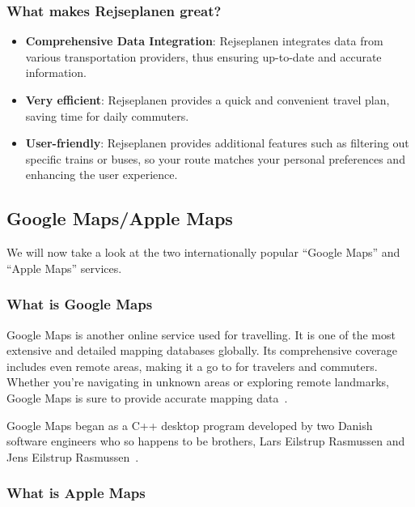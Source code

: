 \subsubsection{What makes Rejseplanen great?}\label{subsubsec:what-makes-rejseplanen-great?}

\begin{itemize}
    \item \textbf{Comprehensive Data Integration}: Rejseplanen integrates data from various transportation providers,
    thus ensuring up-to-date and accurate information.
    \item \textbf{Very efficient}: Rejseplanen provides a quick and convenient travel plan, saving time for daily
    commuters.
    \item \textbf{User-friendly}: Rejseplanen provides additional features such as filtering out specific trains or
    buses, so your route matches your personal preferences and enhancing the user experience.
\end{itemize}

\subsection{Google Maps/Apple Maps}\label{subsec:google-maps-/-apple-maps}

We will now take a look at the two internationally popular ``Google Maps'' and ``Apple Maps'' services.

\subsubsection{What is Google Maps}

Google Maps is another online service used for travelling.
It is one of the most extensive and detailed mapping databases globally.
Its comprehensive coverage includes even remote areas, making it a go to for travelers and commuters.
Whether you're navigating in unknown areas or exploring remote landmarks, Google Maps is sure to provide accurate
mapping data~\cite{googlemaps2023}.

Google Maps began as a C++ desktop program developed by two Danish software engineers who so happens to be brothers,
Lars Eilstrup Rasmussen and Jens Eilstrup Rasmussen~\cite{googlemaps2023}.

\subsubsection{What is Apple Maps}


